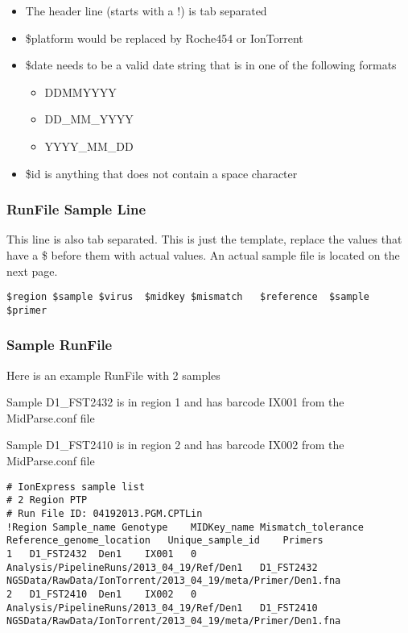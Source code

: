 \documentclass{article}
\begin{document}
\begin{itemize}
 \item The header line (starts with a !) is tab separated
 \item \$platform would be replaced by Roche454 or IonTorrent
 \item \$date needs to be a valid date string that is in one of the following formats
 \begin{itemize}
  \item DDMMYYYY
  \item DD\_MM\_YYYY
  \item YYYY\_MM\_DD
 \end{itemize}
 \item \$id is anything that does not contain a space character
\end{itemize}
\subsubsection{RunFile Sample Line}
This line is also tab separated. This is just the template, replace the values that have a \$ before them with actual values.
An actual sample file is located  on the next page.
\begin{lstlisting}[basicstyle=\tiny]
$region	$sample	$virus	$midkey	$mismatch	$reference	$sample	$primer	
\end{lstlisting}

\subsubsection{Sample RunFile}
Here is an example RunFile with 2 samples

Sample D1\_FST2432 is in region 1 and has barcode IX001 from the MidParse.conf file	

Sample D1\_FST2410 is in region 2 and has barcode IX002 from the MidParse.conf file	

\begin{landscape}
{\tiny
\begin{lstlisting}[basicstyle=\tiny]
# IonExpress sample list
# 2 Region PTP
# Run File ID: 04192013.PGM.CPTLin
!Region	Sample_name	Genotype	MIDKey_name	Mismatch_tolerance	Reference_genome_location	Unique_sample_id	Primers	
1	D1_FST2432	Den1	IX001	0	Analysis/PipelineRuns/2013_04_19/Ref/Den1	D1_FST2432	NGSData/RawData/IonTorrent/2013_04_19/meta/Primer/Den1.fna	
2	D1_FST2410	Den1	IX002	0	Analysis/PipelineRuns/2013_04_19/Ref/Den1	D1_FST2410	NGSData/RawData/IonTorrent/2013_04_19/meta/Primer/Den1.fna	
\end{lstlisting}
}
\end{landscape}
\end{document}
